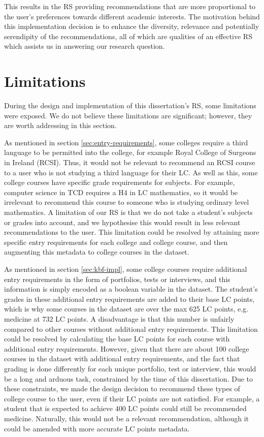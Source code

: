 This results in the RS providing recommendations that are more proportional to the user's preferences towards different academic interests.
The motivation behind this implementation decision is to enhance the diversity, relevance and potentially serendipity of the recommendations,
all of which are qualities of an effective RS which assists us in answering our research question.

\section{Limitations}
\label{sec:impl-limit}

During the design and implementation of this dissertation's RS,
some limitations were exposed.
We do not believe these limitations are significant;
however, they are worth addressing in this section.

As mentioned in section \ref{sec:entry-requirements}, some colleges require a third language to be 
permitted into the college, for example Royal College of Surgeons in Ireland (RCSI).
Thus, it would not be relevant to recommend an RCSI course to a user who 
is not studying a third language for their LC.
As well as this, some college courses have specific grade requirements for subjects.
For example, computer science in TCD requires a H4 in LC mathematics,
so it would be irrelevant to recommend this course to someone who is studying ordinary level mathematics.
A limitation of our RS is that we do not take a student's subjects or grades into account, 
and we hypothesise this would result in less relevant recommendations to the user.
This limitation could be resolved by attaining more specific entry requirements for each college and 
college course, and then augmenting this metadata to college courses in the dataset.

As mentioned in section \ref{sec:kbf-impl}, some college courses require additional entry requirements in 
the form of portfolios, tests or interviews, and this information is simply encoded as a boolean variable in the dataset.
The student's grades in these additional entry requirements are added to their base LC points,
which is why some courses in the dataset are over the max 625 LC points, e.g. medicine at 732 LC points.
A disadvantage is that this number is unfairly compared to other
courses without additional entry requirements.
This limitation could be resolved by calculating the base LC points for each course with additional entry 
requirements.
However, given that there are about 100 college courses in the dataset with additional entry requirements,
and the fact that grading is done differently for each unique portfolio, test or interview,
this would be a long and arduous task, constrained by the time of this dissertation.
Due to these constraints, we made the design decision to recommend these types of college course to the user,
even if their LC points are not satisfied.
For example, a student that is expected to achieve 400 LC points could still be recommended medicine.
Naturally, this would not be a relevant recommendation,
although it could be amended with more accurate LC points metadata.

